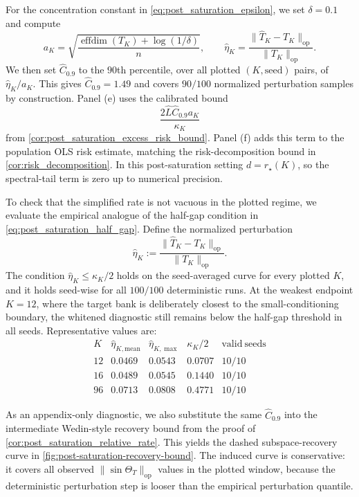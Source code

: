 For the concentration constant in \eqref{eq:post_saturation_epsilon}, we set
$\delta=0.1$ and compute
\[
    a_K
    =
    \sqrt{\frac{\operatorname{effdim}(T_K)+\log(1/\delta)}{n}},
    \qquad
    \widehat{\eta}_K
    =
    \frac{\|\widehat T_K-T_K\|_{\mathrm{op}}}{\|T_K\|_{\mathrm{op}}}.
\]
We then set $\widehat C_{0.9}$ to the $90$th percentile, over all plotted
$(K,\mathrm{seed})$ pairs, of $\widehat{\eta}_K/a_K$. This gives
$\widehat C_{0.9}=1.49$ and covers $90/100$ normalized perturbation samples by
construction. Panel (e) uses the calibrated bound
\[
    \frac{2\widehat L\widehat C_{0.9}a_K}{\kappa_K}
\]
from \cref{cor:post_saturation_excess_risk_bound}. Panel (f) adds this term to
the population OLS risk estimate, matching the risk-decomposition bound in
\cref{cor:risk_decomposition}. In this post-saturation setting
$d=r_\star(K)$, so the spectral-tail term is zero up to numerical precision.

To check that the simplified rate is not vacuous in the plotted regime, we
evaluate the empirical analogue of the half-gap condition in
\eqref{eq:post_saturation_half_gap}. Define the normalized perturbation
\[
    \widehat{\eta}_K
    :=
    \frac{\|\widehat T_K-T_K\|_{\mathrm{op}}}
    {\|T_K\|_{\mathrm{op}}}.
\]
The condition $\widehat{\eta}_K\le \kappa_K/2$ holds on the seed-averaged curve
for every plotted $K$, and it holds seed-wise for all $100/100$ deterministic
runs. At the weakest endpoint $K=12$, where the target bank is deliberately
closest to the small-conditioning boundary, the whitened diagnostic still
remains below the half-gap threshold in all seeds.
Representative values are:
\[
\begin{array}{c|cccc}
K & \widehat{\eta}_{K,\mathrm{mean}} & \widehat{\eta}_{K,\max}
  & \kappa_K/2 & \mathrm{valid\ seeds} \\
\hline
12 & 0.0469 & 0.0543 & 0.0707 & 10/10 \\
16 & 0.0489 & 0.0545 & 0.1440 & 10/10 \\
96 & 0.0713 & 0.0808 & 0.4771 & 10/10
\end{array}
\]

As an appendix-only diagnostic, we also substitute the same
$\widehat C_{0.9}$ into the intermediate Wedin-style recovery bound from the
proof of \cref{cor:post_saturation_relative_rate}. This yields the dashed
subspace-recovery curve in
\cref{fig:post-saturation-recovery-bound}. The induced curve is conservative:
it covers all observed $\|\sin\Theta_T\|_{\mathrm{op}}$ values in the plotted
window, because the deterministic perturbation step is looser than the empirical
perturbation quantile.

